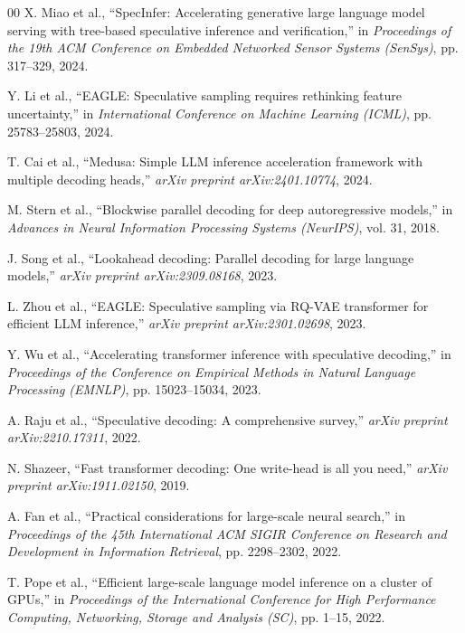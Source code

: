 \documentclass[conference]{IEEEtran}
\begin{document}
\begin{thebibliography}{00}
X. Miao et al., ``SpecInfer: Accelerating generative large language model serving with tree-based speculative inference and verification,'' in \textit{Proceedings of the 19th ACM Conference on Embedded Networked Sensor Systems (SenSys)}, pp. 317--329, 2024.

Y. Li et al., ``EAGLE: Speculative sampling requires rethinking feature uncertainty,'' in \textit{International Conference on Machine Learning (ICML)}, pp. 25783--25803, 2024.

T. Cai et al., ``Medusa: Simple LLM inference acceleration framework with multiple decoding heads,'' \textit{arXiv preprint arXiv:2401.10774}, 2024.

M. Stern et al., ``Blockwise parallel decoding for deep autoregressive models,'' in \textit{Advances in Neural Information Processing Systems (NeurIPS)}, vol. 31, 2018.

J. Song et al., ``Lookahead decoding: Parallel decoding for large language models,'' \textit{arXiv preprint arXiv:2309.08168}, 2023.

L. Zhou et al., ``EAGLE: Speculative sampling via RQ-VAE transformer for efficient LLM inference,'' \textit{arXiv preprint arXiv:2301.02698}, 2023.

Y. Wu et al., ``Accelerating transformer inference with speculative decoding,'' in \textit{Proceedings of the Conference on Empirical Methods in Natural Language Processing (EMNLP)}, pp. 15023--15034, 2023.

A. Raju et al., ``Speculative decoding: A comprehensive survey,'' \textit{arXiv preprint arXiv:2210.17311}, 2022.

N. Shazeer, ``Fast transformer decoding: One write-head is all you need,'' \textit{arXiv preprint arXiv:1911.02150}, 2019.

A. Fan et al., ``Practical considerations for large-scale neural search,'' in \textit{Proceedings of the 45th International ACM SIGIR Conference on Research and Development in Information Retrieval}, pp. 2298--2302, 2022.

T. Pope et al., ``Efficient large-scale language model inference on a cluster of GPUs,'' in \textit{Proceedings of the International Conference for High Performance Computing, Networking, Storage and Analysis (SC)}, pp. 1--15, 2022.


\end{thebibliography}
\end{document}
